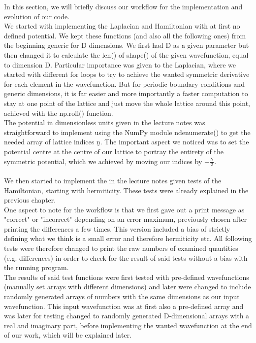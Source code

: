 \documentclass[11pt, letterpaper, onecolumn]{article}
\begin{document}
	In this section, we will briefly discuss our workflow for the implementation and evolution of our code.
	\\
	We started with implementing the Laplacian and Hamiltonian with at first no defined potential. We kept these functions (and also all the following ones) from the beginning generic for D dimensions. We first had D as a given parameter but then changed it to calculate the len() of shape() of the given wavefunction, equal to dimension D. Particular importance was given to the Laplacian, where we started with different for loops to try to achieve the wanted symmetric derivative for each element in the wavefunction. But for periodic boundary conditions and generic dimensions, it is far easier and more importantly a faster computation to stay at one point of the lattice and just move the whole lattice around this point, achieved with the np.roll() function. \\
	The potential in dimensionless units given in the lecture notes was straightforward to implement using the NumPy module ndenumerate() to get the needed array of lattice indices $\mathrm{\underline{n}}$. The important aspect we noticed was to set the potential centre at the centre of our lattice to portray the entirety of the symmetric potential, which we achieved by moving our indices by $\mathrm{-\frac{N}{2}}$.
	\\
	\\
	We then started to implement the in the lecture notes given tests of the Hamiltonian, starting with hermiticity. These tests were already explained in the previous chapter. \\
	One aspect to note for the workflow is that we first gave out a print message as "correct" or "incorrect" depending on an error maximum, previously chosen after printing the differences a few times. This version included a bias of strictly defining what we think is a small error and therefore hermiticity etc. All following tests were therefore changed to print the raw numbers of examined quantities (e.g. differences) in order to check for the result of said tests without a bias with the running program. \\
	The results of said test functions were first tested with pre-defined wavefunctions (manually set arrays with different dimensions) and later were changed to include randomly generated arrays of numbers with the same dimensions as our input wavefunction. This input wavefunction was at first also a pre-defined array and was later for testing changed to randomly generated D-dimensional arrays with a real and imaginary part, before implementing the wanted wavefunction at the end of our work, which will be explained later.\\
\end{document}
